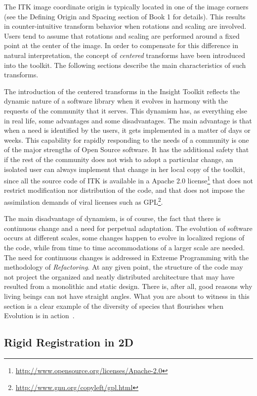 The ITK image coordinate origin is typically located in one of the image
corners (see the  Defining Origin and Spacing section of Book 1 for details).
This results in counter-intuitive transform behavior when rotations and scaling
are involved. Users tend to assume that rotations and scaling are performed
around a fixed point at the center of the image.  In order to compensate for
this difference in natural interpretation, the concept of \emph{centered}
transforms have been introduced into the toolkit. The following sections
describe the main characteristics of such transforms.

The introduction of the centered transforms in the Insight Toolkit reflects the
dynamic nature of a software library when it evolves in harmony with the
requests of the community that it serves. This dynamism has, as everything else
in real life, some advantages and some disadvantages. The main advantage is that
when a need is identified by the users, it gets implemented in a matter of days
or weeks.  This capability for rapidly responding to the needs of a community
is one of the major strengths of Open Source software. It has the additional
safety that if the rest of the community does not wish to adopt a particular
change, an isolated user can always implement that change in her local copy of
the toolkit, since all the source code of ITK is available in a Apache 2.0
license\footnote{\url{http://www.opensource.org/licenses/Apache-2.0}} that
does not restrict modification nor distribution of the code, and that does not
impose the assimilation demands of viral licenses such as
GPL\footnote{\url{http://www.gnu.org/copyleft/gpl.html}}.

The main disadvantage of dynamism, is of course, the fact that there is
continuous change and a need for perpetual adaptation. The evolution of
software occurs at different scales, some changes happen to evolve in localized
regions of the code, while from time to time accommodations of a larger scale
are needed. The need for continuous changes is addressed in Extreme Programming
with the methodology of \emph{Refactoring}. At any given point, the structure
of the code may not project the organized and neatly distributed architecture
that may have resulted from a monolithic and static design. There is, after
all, good reasons why living beings can not have straight angles. What you are
about to witness in this section is a clear example of the diversity of species
that flourishes when Evolution is in action~\cite{Darwin1999}.


\subsection{Rigid Registration in 2D}
\label{sec:RigidRegistrationIn2D}
\ifitkFullVersion

\fi

